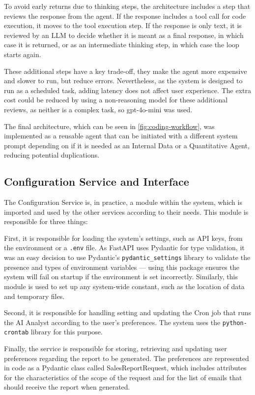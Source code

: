 \documentclass[a4paper]{report}
\begin{document}
To avoid early returns due to thinking steps, the architecture includes a step that reviews the response from the agent. If the response includes a tool call for code execution, it moves to the tool execution step. If the response is only text, it is reviewed by an LLM to decide whether it is meant as a final response, in which case it is returned, or as an intermediate thinking step, in which case the loop starts again.

These additional steps have a key trade-off, they make the agent more expensive and slower to run, but reduce errors. Nevertheless, as the system is designed to run as a scheduled task, adding latency does not affect user experience. The extra cost could be reduced by using a non-reasoning model for these additional reviews, as neither is a complex task, so gpt-4o-mini was used.

The final architecture, which can be seen in \autoref{fig:coding-workflow}, was implemented as a reusable agent that can be initiated with a different system prompt depending on if it is needed as an Internal Data or a Quantitative Agent, reducing potential duplications.

\subsection{Configuration Service and Interface}
\label{subsec:config-implementation}

The Configuration Service is, in practice, a module within the system, which is imported and used by the other services according to their needs. This module is responsible for three things:

First, it is responsible for loading the system's settings, such as API keys, from the environment or a \texttt{.env} file. As FastAPI uses Pydantic for type validation, it was an easy decision to use Pydantic's \texttt{pydantic\_settings} library to validate the presence and types of environment variables --- using this package ensures the system will fail on startup if the environment is set incorrectly. Similarly, this module is used to set up any system-wide constant, such as the location of data and temporary files.

Second, it is responsible for handling setting and updating the Cron job that runs the AI Analyst according to the user's preferences. The system uses the \texttt{python-crontab} library for this purpose.

Finally, the service is responsible for storing, retrieving and updating user preferences regarding the report to be generated. The preferences are represented in code as a Pydantic class called SalesReportRequest, which includes attributes for the characteristics of the scope of the request and for the list of emails that should receive the report when generated.
\end{document}
